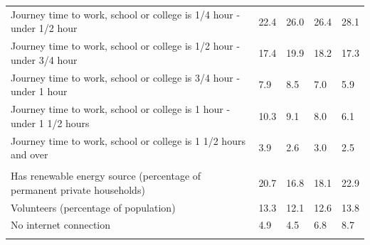 \documentclass{article}
\begin{document}
\begin{table}[h]
\begin{tabular}{KTTTT}
Journey time to work, school or college is 1/4 hour - under 1/2 hour & 22.4& 26.0& 26.4& 28.1\\
Journey time to work, school or college is 1/2 hour - under 3/4 hour & 17.4& 19.9& 18.2& 17.3\\
Journey time to work, school or college is 3/4 hour - under 1 hour & 7.9& 8.5& 7.0& 5.9\\
Journey time to work, school or college is 1 hour - under 1 1/2 hours & 10.3&  9.1&  8.0&  6.1\\
Journey time to work, school or college is 1 1/2 hours and over & 3.9& 2.6& 3.0& 2.5\\
\hline
    \\ 
    \hline
Has renewable energy source (percentage of permanent private households) & 20.7& 16.8& 18.1& 22.9\\
    \hline
Volunteers (percentage of population) & 13.3& 12.1& 12.6& 13.8\\
    \hline
No internet connection& 4.9& 4.5& 6.8& 8.7\\
\hline
\end{tabular}
\end{table}
\end{document}
